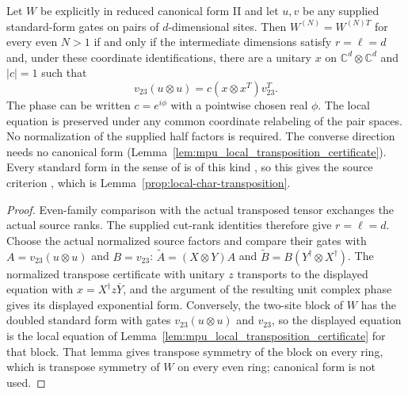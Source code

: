 \begin{lemma}
    \label{lem:mpu_supplied_even_transposition_criterion}
    \leanok
    Let $W$ be explicitly in reduced canonical form II and let $u,v$ be
    any supplied standard-form gates on pairs of $d$-dimensional sites.
    Then $W^{(N)}=W^{(N)T}$ for every even $N>1$ if and only if the
    intermediate dimensions satisfy $r=\ell=d$ and, under these coordinate
    identifications, there are a unitary $x$ on
    $\mathbb C^d\otimes\mathbb C^d$ and $|c|=1$ such that
    \[
        v_{23}(u\otimes u)=c(x\otimes x^T)v_{23}^T.
    \]
    The phase can be written $c=e^{i\phi}$ with a pointwise chosen real
    $\phi$. The local equation is preserved under any common coordinate
    relabeling of the pair spaces. No normalization of the supplied half
    factors is required. The converse direction needs no canonical form
    (Lemma~\ref{lem:mpu_local_transposition_certificate}). Every standard form
    in the sense of
    \cite[Definition~III.9]{Cirac2017MPU} is of this kind
    \cite{gap:mpu_standard_form_canonical_convention}, so this gives the
    source criterion \cite[lines~1258--1288]{Cirac2017MPU}, which is
    Lemma~\ref{prop:local-char-transposition}.
\end{lemma}
\begin{proof}\leanok
    Even-family comparison with the actual transposed tensor exchanges
    the actual source ranks. The supplied cut-rank identities therefore
    give $r=\ell=d$. Choose the actual normalized source factors and
    compare their gates with $A=v_{23}(u\otimes u)$ and $B=v_{23}$:
    $\widetilde A=(X\otimes Y)A$ and
    $\widetilde B=B(Y^\dagger\otimes X^\dagger)$.
    The normalized transpose certificate with unitary $z$ transports to
    the displayed equation with $x=X^\dagger z\overline Y$, and the
    argument of the resulting unit complex phase gives its displayed
    exponential form. Conversely, the two-site block of $W$ has the doubled
    standard form with gates $v_{23}(u\otimes u)$ and $v_{23}$, so the
    displayed equation is the local equation of
    Lemma~\ref{lem:mpu_local_transposition_certificate} for that block.
    That lemma gives transpose symmetry of the block on every ring, which is
    transpose symmetry of $W$ on every even ring; canonical form is not used.
\end{proof}

